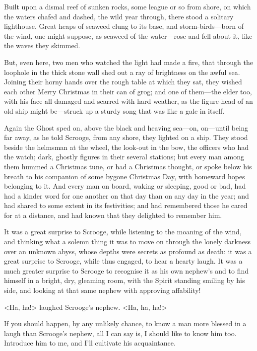 Built upon a dismal reef of sunken rocks, some league or so from shore, on which the waters chafed and dashed, the wild year through, there stood a solitary lighthouse. Great heaps of seaweed clung to its base, and storm-birds—born of the wind, one might suppose, as seaweed of the water—rose and fell about it, like the waves they skimmed.

But, even here, two men who watched the light had made a fire, that through the loophole in the thick stone wall shed out a ray of brightness on the awful sea. Joining their horny hands over the rough table at which they sat, they wished each other Merry Christmas in their can of grog; and one of them—the elder too, with his face all damaged and scarred with hard weather, as the figure-head of an old ship might be—struck up a sturdy song that was like a gale in itself.

Again the Ghost sped on, above the black and heaving sea—on, on—until being far away, as he told Scrooge, from any shore, they lighted on a ship. They stood beside the helmsman at the wheel, the look-out in the bow, the officers who had the watch; dark, ghostly figures in their several stations; but every man among them hummed a Christmas tune, or had a Christmas thought, or spoke below his breath to his companion of some bygone Christmas Day, with homeward hopes belonging to it. And every man on board, waking or sleeping, good or bad, had had a kinder word for one another on that day than on any day in the year; and had shared to some extent in its festivities; and had remembered those he cared for at a distance, and had known that they delighted to remember him.

It was a great surprise to Scrooge, while listening to the moaning of the wind, and thinking what a solemn thing it was to move on through the lonely darkness over an unknown abyss, whose depths were secrets as profound as death: it was a great surprise to Scrooge, while thus engaged, to hear a hearty laugh. It was a much greater surprise to Scrooge to recognise it as his own  nephew's and to find himself in a bright, dry, gleaming room, with the Spirit standing smiling by his side, and looking at that same nephew with approving affability!

<Ha, ha!> laughed Scrooge's nephew. <Ha, ha, ha!>

If you should happen, by any unlikely chance, to know a man more blessed in a laugh than Scrooge's nephew, all I can say is, I should like to know him too. Introduce him to me, and I'll cultivate his acquaintance.

